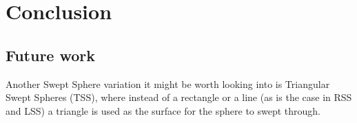 
\section{Conclusion}
\label{conclusion}

\subsection{Future work}
Another Swept Sphere variation it might be worth looking into is Triangular Swept Spheres (TSS), where instead of a rectangle or a line (as is the case in RSS and LSS) a triangle is used as the surface for the sphere to swept through.
